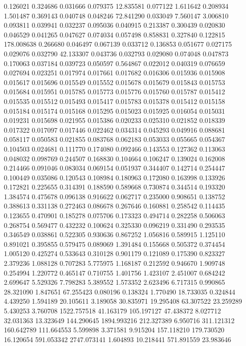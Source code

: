 0.126021
0.324686
0.031666
0.079375
12.835581
0.077122
1.611642
0.208934
1.501487
0.369143
0.040748
0.048246
72.841290
0.033049
7.560147
3.006810
0.093811
0.039941
0.032237
0.095036
0.040915
0.213387
0.300439
0.020830
0.046529
0.041265
0.047627
0.074034
0.057498
0.858831
0.327840
0.122815
178.008638
0.266680
0.046497
0.067139
0.033712
0.136853
0.051677
0.027175
0.029076
0.032790
42.133307
0.043736
0.032793
0.029080
0.074048
0.047873
0.170063
0.037184
0.039723
0.050597
0.564867
0.022012
0.040319
0.076659
0.027694
0.023251
0.017974
0.017661
0.017682
0.016306
0.015936
0.015908
0.015617
0.015696
0.015549
0.015552
0.015678
0.015679
0.015843
0.015753
0.015684
0.015951
0.015785
0.015773
0.015776
0.015760
0.015787
0.015412
0.015535
0.015512
0.015493
0.015417
0.015783
0.015378
0.015412
0.015158
0.015184
0.015174
0.015168
0.015295
0.015023
0.015925
0.016054
0.015031
0.019231
0.015698
0.021955
0.015386
0.020233
0.025310
0.021852
0.018339
0.017322
0.017097
0.017446
0.022462
0.034314
0.045293
0.049916
0.088681
0.058117
0.050583
0.021855
0.083768
0.062183
0.053033
0.055665
0.054367
0.104503
0.024681
0.111770
0.174080
0.092466
0.143553
0.127362
0.113063
0.048032
0.098769
0.244507
0.168830
0.104664
0.106247
0.139024
0.162008
0.214466
0.091046
0.083034
0.069154
0.051937
0.344407
0.142714
0.254447
0.100449
0.035086
0.120543
0.108984
0.180963
0.172080
0.163998
0.133926
0.172821
0.225655
0.314391
0.188590
0.589668
0.730874
0.344514
0.193320
1.384574
0.475678
0.096138
0.916622
0.062717
0.235000
0.908651
0.138752
0.388613
0.331138
0.272463
0.086678
0.267646
0.160881
0.258542
0.114435
0.123655
0.470901
0.185278
0.075706
0.173323
0.494714
0.282258
0.506063
0.268754
0.569477
0.432232
0.100624
0.325330
0.096219
0.331490
0.293535
0.346549
0.038861
0.522305
0.930636
0.867252
1.056816
0.589915
1.125110
0.891021
0.395855
0.579475
0.089069
1.391484
0.155668
0.505372
0.374454
1.005120
0.425274
0.533643
0.310128
0.901179
0.121089
0.175390
0.823327
2.379236
1.088128
0.707283
5.775975
1.168187
0.212592
0.946670
1.909748
0.254994
1.220772
0.465147
0.710755
1.401756
1.423107
2.451007
0.684242
2.699647
5.529326
7.798283
5.389552
1.573352
2.623496
6.717315
0.990865
28.321090
1.847651
67.255423
0.080196
0.138324
1.770490
18.733035
0.324844
4.439250
1.594189
20.105611
3.189058
30.835971
19.295408
63.307522
23.259289
5.430253
3.760708
1522.757518
41.163179
105.197127
47.438372
8.027712
32.031363
13.323649
144.290645
1894.993216
212.327389
6.950716
311.121312
160.642789
111.664553
5.599898
3.371581
9.915204
157.118210
179.730520
16.120654
591.053342
2747.073141
1.604893
10.218441
571.891559
23.983646
